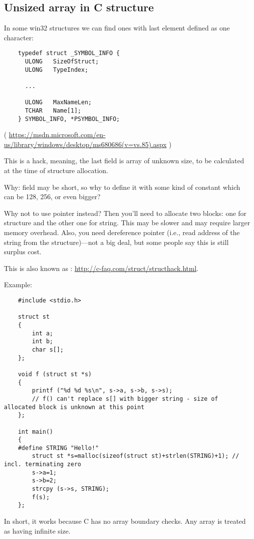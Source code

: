\subsection{Unsized array in C structure}

In some win32 structures we can find ones with last element defined as one character:

\begin{lstlisting}
	typedef struct _SYMBOL_INFO {
	  ULONG   SizeOfStruct;
	  ULONG   TypeIndex;
	  
	  ...
	
	  ULONG   MaxNameLen;
	  TCHAR   Name[1];
	} SYMBOL_INFO, *PSYMBOL_INFO;
\end{lstlisting}

( \url{https://msdn.microsoft.com/en-us/library/windows/desktop/ms680686(v=vs.85).aspx} )

This is a hack, meaning, the last field is array of unknown size, to be calculated at the time of structure allocation.

Why:  field may be short, so why to define it with some kind of 
constant which can be 128, 256, or even bigger?

Why not to use pointer instead? Then you'll need to allocate two blocks: one for structure and the other one for string.
This may be slower and may require larger memory overhead.
Also, you need dereference pointer (i.e., read address of the string from the structure)---not a big deal, but some
people say this is still surplus cost.

This is also known as : \url{http://c-faq.com/struct/structhack.html}.

Example:

\begin{lstlisting}
	#include <stdio.h>

	struct st
	{
		int a;
		int b;
		char s[];
	};

	void f (struct st *s)
	{
		printf ("%d %d %s\n", s->a, s->b, s->s);
		// f() can't replace s[] with bigger string - size of allocated block is unknown at this point
	};

	int main()
	{
	#define STRING "Hello!"
		struct st *s=malloc(sizeof(struct st)+strlen(STRING)+1); // incl. terminating zero
		s->a=1;
		s->b=2;
		strcpy (s->s, STRING);
		f(s);
	};
\end{lstlisting}

In short, it works because C has no array boundary checks. Any array is treated as having infinite size.

